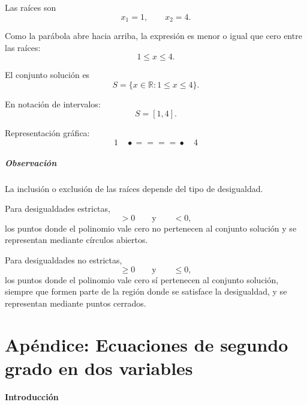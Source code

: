 \documentclass[12pt]{article}
\theoremstyle{plain}
\theoremstyle{definition}
\theoremstyle{remark}
\begin{document}
{\begin{enumerate}
Las raíces son
\[
x_1=1,
\qquad
x_2=4.
\]

Como la parábola abre hacia arriba, la expresión es menor o igual que
cero entre las raíces:
\[
1\leq x\leq4.
\]

El conjunto solución es
\[
\boxed{
S=
\{x\in\mathbb{R}:1\leq x\leq4\}.
}
\]

En notación de intervalos:
\[
\boxed{
S=[1,4].
}
\]

Representación gráfica:
\[
1\quad
\bullet\!\!=\!\!=\!\!=\!\!=\!\bullet
\quad4
\]

\end{enumerate}

\subsubsection*{Observación}
La inclusión o exclusión de las raíces depende del tipo de desigualdad.

Para desigualdades estrictas,
\[
>0
\qquad\text{y}\qquad
<0,
\]
los puntos donde el polinomio vale cero no pertenecen al conjunto
solución y se representan mediante círculos abiertos.

Para desigualdades no estrictas,
\[
\geq0
\qquad\text{y}\qquad
\leq0,
\]
los puntos donde el polinomio vale cero sí pertenecen al conjunto
solución, siempre que formen parte de la región donde se satisface la
desigualdad, y se representan mediante puntos cerrados.

\part{Ap\'endice: Ecuaciones de segundo grado en dos variables}
\setcounter{section}{4}


\subsection*{Introducción}

}
\end{document}
